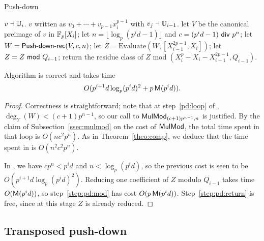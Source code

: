 \begin{algorithm}
  \caption{Push-down}
  \begin{algorithmic}[1]
    \REQUIRE $v\dashv \mathbb{U}_i$.
    \ENSURE $v$ written as $v_0+\cdots+v_{p-1}x_i^{p-1}$ with $v_j \dashv \mathbb{U}_{i-1}$.
    \STATE let $V$ be the canonical preimage of $v$ in $\mathbb{F}_p[X_i]$;
    \STATE let $n=\lfloor \log_p(p^id-1) \rfloor$ and $c=(p^id-1){\sf~div~} p^n$;
    \STATE let $W = \text{{\sf Push-down-rec}}(V,c,n)$;
    \STATE let $Z = \text{Evaluate}(W,[X_{i-1}^{2p-1},X_i])$;
    \STATE \label{step:pd:mod} let $Z = Z {\sf~mod~} Q_{i-1}$;
    \STATE \label{step:pd:return} return the residue class of $Z$ mod $(X_i^p - X_i - X_{i-1}^{2p-1},Q_{i-1})$.
  \end{algorithmic}
\end{algorithm}

\begin{proposition}\label{prop:pd}
  Algorithm  is correct and takes time 
  \begin{equation}
    \label{eq:92}
    O(p^{i+1}d
    \log_p(p^id)^2 + p\,\mathsf{M}(p^id))
    \text{.}
  \end{equation}
\end{proposition}
\begin{proof}
  Correctness is straightforward; note that at step~\ref{pd:loop} of
  , $\deg_Y(W) < (c+1)p^{n-1}$, so our call to
  ${\sf MulMod}_{(c+1)p^{n-1},n}$ is justified. By the claim of
  Subsection~\ref{ssec:mulmod} on the cost of ${\sf MulMod}$, the
  total time spent in that loop is $O(nc^2p^n)$. As in
  Theorem~\ref{theo:comp}, we deduce that the time spent in
   is $O(n^2c^2p^n)$.

  In , we have $cp^n< p^id$ and $n<\log_p (p^id)$, so
  the previous cost is seen to be $O(p^{i+1}d
  \log_p(p^id)^2)$. Reducing one coefficient of $Z$ modulo $Q_{i-1}$
  takes time $O(\mathsf{M}(p^id))$, so step~\ref{step:pd:mod} has cost
  $O(p\,\mathsf{M}(p^id))$. Step~\ref{step:pd:return} is free, since at
  this stage $Z$ is already reduced. 
\end{proof}


\subsection{Transposed push-down}


